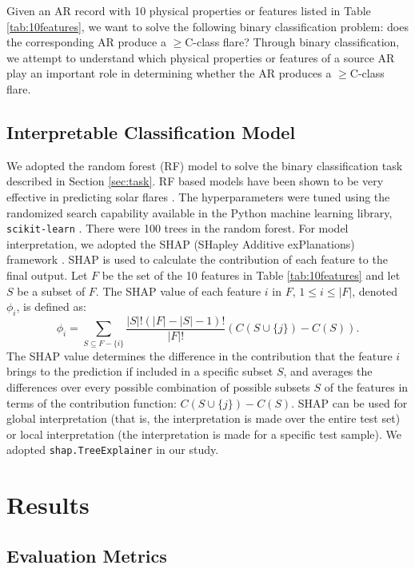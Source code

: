 \documentclass[draft]{agujournal2019}
\begin{document}
Given an AR record with 10 physical properties or features
listed in Table \ref{tab:10features}, 
we want to solve the following binary classification problem:
does the corresponding AR produce a $\geq$C-class flare? 
Through binary classification, we attempt to understand
which physical properties or features of a source AR play an important role in determining whether
the AR produces a $\geq$C-class flare. 

\subsection{Interpretable Classification Model}
\label{sec:shap}

We adopted the random forest (RF) model to solve the binary classification task
described in Section \ref{sec:task}.
RF based models have been shown to be very effective in predicting solar flares
\citep{2017ApJ...843..104L}.
The hyperparameters were tuned using
the randomized search capability available in the Python machine learning library, {\tt scikit-learn}
\citep{10.5555/1953048.2078195}.
There were 100 trees in the random forest. 
For model interpretation, we adopted
the SHAP (SHapley Additive exPlanations) framework
\citep{DBLP:conf/nips/LundbergL17}.
SHAP is used to calculate the contribution of each feature to the final output. 
Let $F$ be the set of the 10 features in Table \ref{tab:10features}
and let $S$ be a subset of $F$.
The SHAP value of each feature $i$ in $F$, $1 \leq i \leq |F|$,
denoted $\phi_{i}$,
is defined as:
\begin{equation}
\phi_{i} = \sum_{S \subseteq F-\{i\}}\frac{|S|!(|F|-|S|-1)!}{|F|!}(C(S\cup\{j\})-C(S)).
\end{equation}
The SHAP value determines the difference in the contribution that the feature $i$ brings to the prediction if included in
a specific subset $S$, and averages the differences over every possible
combination of possible subsets $S$ of the features in terms of the
contribution function:
$C(S\cup\{j\})-C(S)$.
SHAP can be used for global interpretation (that is, the interpretation is made over the entire test set)
or local interpretation (the interpretation is made for a specific test sample).
We adopted {\tt shap.TreeExplainer} in
our study.

\section{Results}
\label{sec:results}

\subsection{Evaluation Metrics}
\end{document}

